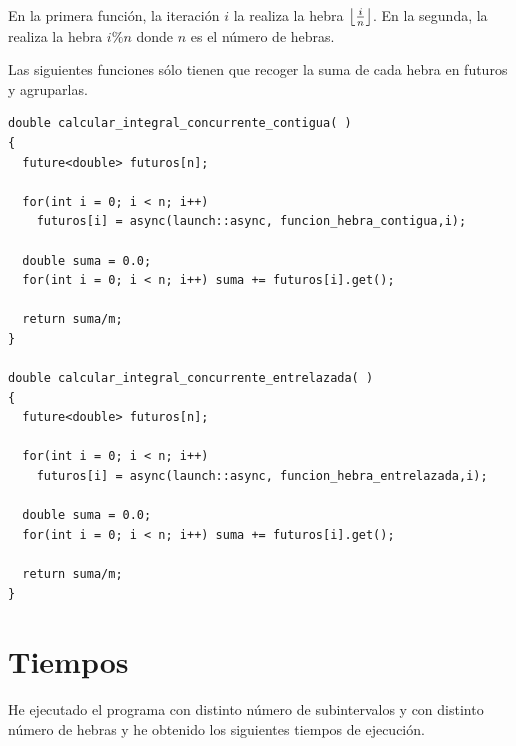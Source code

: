 \documentclass[12pt,spanish]{article}
\DeclarePairedDelimiter\floor{\lfloor}{\rfloor}
\begin{document}
En la primera función, la iteración $i$ la realiza la hebra
$\floor*{\frac{i}{n}}$. En la segunda, la realiza la hebra $i\%n$
donde $n$ es el número de hebras.

Las siguientes funciones sólo tienen que recoger la suma de cada hebra
en futuros y agruparlas.

\begin{lstlisting}
double calcular_integral_concurrente_contigua( )
{
  future<double> futuros[n];

  for(int i = 0; i < n; i++)
    futuros[i] = async(launch::async, funcion_hebra_contigua,i);

  double suma = 0.0;
  for(int i = 0; i < n; i++) suma += futuros[i].get();
  
  return suma/m;
}

double calcular_integral_concurrente_entrelazada( )
{
  future<double> futuros[n];

  for(int i = 0; i < n; i++)
    futuros[i] = async(launch::async, funcion_hebra_entrelazada,i);

  double suma = 0.0;
  for(int i = 0; i < n; i++) suma += futuros[i].get();
  
  return suma/m;
}  
\end{lstlisting}

\section{Tiempos}
He ejecutado el programa con distinto número de subintervalos y con
distinto número de hebras y he obtenido los siguientes tiempos de
ejecución.
\end{document}
